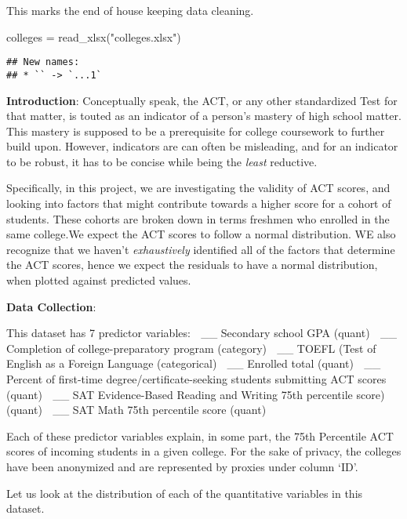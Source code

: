 \documentclass[
]{article}
\newenvironment{Shaded}{\begin{snugshade}}{\end{snugshade}}
\newcommand{\FunctionTok}[1]{\textcolor[rgb]{0.00,0.00,0.00}{#1}}
\newcommand{\NormalTok}[1]{#1}
\newcommand{\OtherTok}[1]{\textcolor[rgb]{0.56,0.35,0.01}{#1}}
\newcommand{\StringTok}[1]{\textcolor[rgb]{0.31,0.60,0.02}{#1}}
\begin{document}
This marks the end of house keeping data cleaning.

\begin{Shaded}
\begin{Highlighting}[]
\NormalTok{colleges }\OtherTok{=} \FunctionTok{read\_xlsx}\NormalTok{(}\StringTok{"colleges.xlsx"}\NormalTok{)}
\end{Highlighting}
\end{Shaded}

\begin{verbatim}
## New names:
## * `` -> `...1`
\end{verbatim}

\textbf{Introduction}: Conceptually speak, the ACT, or any other
standardized Test for that matter, is touted as an indicator of a
person's mastery of high school matter. This mastery is supposed to be a
prerequisite for college coursework to further build upon. However,
indicators are can often be misleading, and for an indicator to be
robust, it has to be concise while being the \emph{least} reductive.

Specifically, in this project, we are investigating the validity of ACT
scores, and looking into factors that might contribute towards a higher
score for a cohort of students. These cohorts are broken down in terms
freshmen who enrolled in the same college.We expect the ACT scores to
follow a normal distribution. WE also recognize that we haven't
\emph{exhaustively} identified all of the factors that determine the ACT
scores, hence we expect the residuals to have a normal distribution,
when plotted against predicted values.

\textbf{Data Collection}:

This dataset has 7 predictor variables:  \_\_ Secondary school GPA
(quant)  \_\_ Completion of college-preparatory program (category) 
\_\_ TOEFL (Test of English as a Foreign Language (categorical)  \_\_
Enrolled total (quant)  \_\_ Percent of first-time
degree/certificate-seeking students submitting ACT scores (quant)  \_\_
SAT Evidence-Based Reading and Writing 75th percentile score) (quant) 
\_\_ SAT Math 75th percentile score (quant)

Each of these predictor variables explain, in some part, the 75th
Percentile ACT scores of incoming students in a given college. For the
sake of privacy, the colleges have been anonymized and are represented
by proxies under column `ID'.

Let us look at the distribution of each of the quantitative variables in
this dataset.
\end{document}

